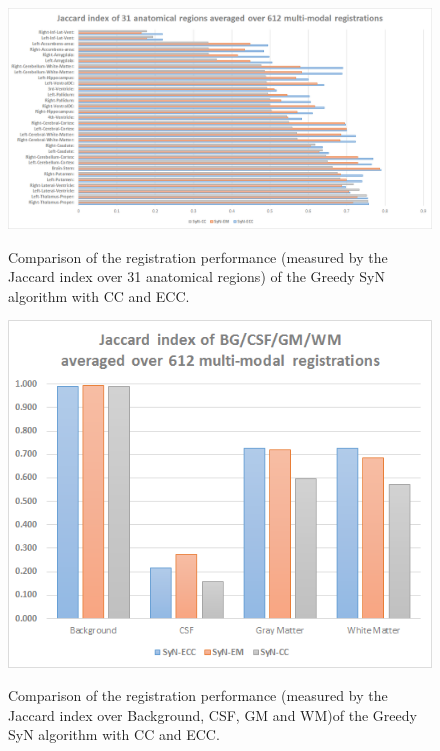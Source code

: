 \begin{figure}[H]
\centering
\label{fig:graph_seg}\includegraphics[width=1.0\linewidth]{./images/multi_graph_seg.png}\\
\caption{Comparison of the registration performance (measured by the Jaccard index over 31 anatomical regions) of the Greedy SyN algorithm with CC and ECC.}
\end{figure}

\begin{figure}[H]
\centering
\label{fig:graph_segTri_fill}\includegraphics[width=1.0\linewidth]{./images/multi_graph_segTri_fill.png}\\
\caption{Comparison of the registration performance (measured by the Jaccard index over Background, CSF, GM and WM)of the Greedy SyN algorithm with CC and ECC.}
\end{figure}
